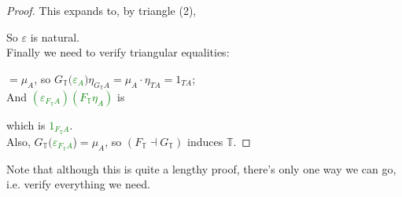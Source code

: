 \documentclass[a4paper]{article}
\begin{document}
\begin{lemma}
\begin{proof}

        This expands to, by triangle (2),


        So $\varepsilon$ is natural.\\
        Finally we need to verify triangular equalities:
        $=\mu_A$, so $G_\mathbb{T}($\textcolor{green}{$\varepsilon_A$}$)\eta_{G_\mathbb{T}A} = \mu_A \cdot \eta_{TA} = 1_{TA}$;\\
        And \textcolor{green}{$(\varepsilon_{F_\mathbb{T}A})(F_\mathbb{T} \eta_A)$} is 


        which is \textcolor{green}{$1_{F_\mathbb{T} A}$}.\\
        Also, $G_\mathbb{T}($\textcolor{green}{$\varepsilon_{F_\mathbb{T} A}$})$=\mu_A$, so $(F_\mathbb{T} \dashv G_\mathbb{T})$ induces $\mathbb{T}$.
    \end{proof}
\end{lemma}

Note that although this is quite a lengthy proof, there's only one way we can go, i.e. verify everything we need.
\end{document}
